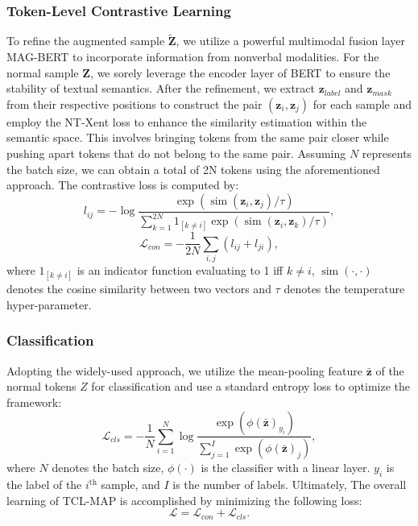 \documentclass[letterpaper]{article} %
\begin{document}
\subsubsection{Token-Level Contrastive Learning}
To refine the augmented sample $\widetilde{\textbf{Z}}$, we utilize a powerful multimodal fusion layer MAG-BERT \cite{rahman2020integrating} to incorporate information from nonverbal modalities. For the normal sample $\textbf{Z}$, we sorely leverage the encoder layer of BERT \cite{devlin2018bert} to ensure the stability of textual semantics. After the refinement, we extract $\textbf{z}_{label}$ and $\textbf{z}_{mask}$ from their respective positions to construct the pair $(\textbf{z}_{i}, \textbf{z}_{j})$ for each sample and employ the NT-Xent \cite{sohn2016improved} loss to enhance the similarity estimation within the semantic space. This involves bringing tokens from the same pair closer while pushing apart tokens that do not belong to the same pair. Assuming $N$ represents the batch size, we can obtain a total of 2N tokens using the aforementioned approach. The contrastive loss is computed by:
\begin{equation}
l_{ij}=-\log \frac{\exp \left(\operatorname{sim}\left(\textbf{z}_i, \textbf{z}_j\right) / \tau\right)}{\sum_{k=1}^{2 N} 1_{[k \neq i]} \exp \left(\operatorname{sim}\left(\textbf{z}_i, \textbf{z}_k\right) / \tau\right)},
\end{equation}
\begin{equation}
\mathcal{L}_{con} = -\frac{1}{2N}\sum_{i,j}(l_{ij}+l_{ji}),
\end{equation}
where $1_{[k \neq i]}$ is an indicator function evaluating to 1 iff $k \neq i$, $\operatorname{sim}(\cdot, \cdot)$ denotes the cosine similarity between two vectors and $\tau$ denotes the temperature hyper-parameter.
\subsubsection{Classification}
Adopting the widely-used approach, we utilize the mean-pooling feature $\bar{\textbf{z}}$ of the normal tokens $Z$ for classification and use a standard entropy loss to optimize the framework:
\begin{equation}
\mathcal{L}_{cls}=-\frac{1}{N}\sum_{i=1}^{N} \log\frac{\exp(\phi(\bar{\textbf{z}})_{y_{i}})}{\sum_{j=1}^{I}\exp(\phi(\bar{\textbf{z}})_{j})},
\end{equation}
where $N$ denotes the batch size, $\phi(\cdot)$ is the classifier with a linear layer. $y_{i}$ is the label of the $i^{\text{th}}$ sample, and $I$ is the number of labels. Ultimately, The overall learning of TCL-MAP is accomplished by minimizing the following loss:
\begin{equation}
\mathcal{L} = \mathcal{L}_{con} + \mathcal{L}_{cls}.
\end{equation}
\end{document}
